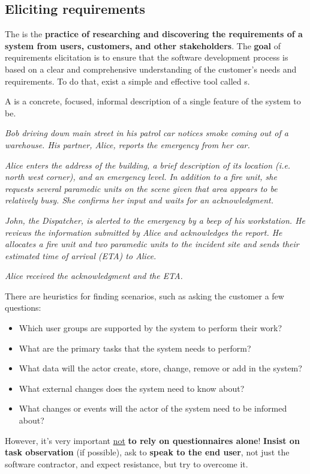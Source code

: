 \subsection{Eliciting requirements}

The  is the \textbf{practice of researching and discovering the requirements of a system from users, customers, and other stakeholders}. The \textbf{goal} of requirements elicitation is to ensure that the software development process is based on a clear and comprehensive understanding of the customer's needs and requirements. To do that, exist a simple and effective tool called s.

\begin{definitionbox}
    A  is a concrete, focused, informal description of a single feature of the system to be.
\end{definitionbox}

\begin{examplebox}
    \emph{Bob driving down main street in his patrol car notices smoke coming out of a warehouse. His partner, Alice, reports the emergency from her car.}

    \highspace
    \emph{Alice enters the address of the building, a brief description of its location (i.e. north west corner), and an emergency level. In addition to a fire unit, she requests several paramedic units on the scene given that area appears to be relatively busy. She confirms her input and waits for an acknowledgment.}

    \highspace
    \emph{John, the Dispatcher, is alerted to the emergency by a beep of his workstation. He reviews the information submitted by Alice and acknowledges the report. He allocates a fire unit and two paramedic units to the incident site and sends their estimated time of arrival (ETA) to Alice.}

    \highspace
    \emph{Alice received the acknowledgment and the ETA.}
\end{examplebox}
There are heuristics for finding scenarios, such as asking the customer a few questions:
\begin{itemize}
    \item Which user groups are supported by the system to perform their work?
    \item What are the primary tasks that the system needs to perform?
    \item What data will the actor create, store, change, remove or add in the system?
    \item What external changes does the system need to know about?
    \item What changes or events will the actor of the system need to be informed about?
\end{itemize}
However, it's very important \underline{not} \textbf{to rely on questionnaires alone}! \textbf{Insist on task observation} (if possible), ask to \textbf{speak to the end user}, not just the software contractor, and expect resistance, but try to overcome it.

